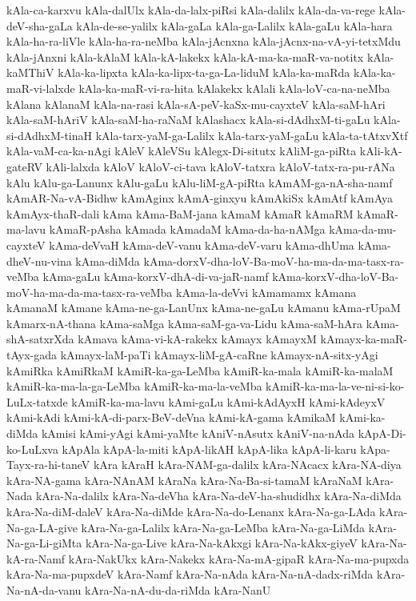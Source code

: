 {kAla-ca-karxvu
kAla-dalUlx
kAla-da-lalx-piRsi
kAla-dalilx
kAla-da-va-rege
kAla-deV-sha-gaLa
kAla-de-se-yalilx
kAla-gaLa
kAla-ga-Lalilx
kAla-gaLu
kAla-hara
kAla-ha-ra-liVle
kAla-ha-ra-neMba
kAla-jAcnxna
kAla-jAcnx-na-vA-yi-tetxMdu
kAla-jAnxni
kAla-kAlaM
kAla-kA-lakekx
kAla-kA-ma-ka-maR-va-notitx
kAla-kaMThiV
kAla-ka-lipxta
kAla-ka-lipx-ta-ga-La-liduM
kAla-ka-maRda
kAla-ka-maR-vi-lalxde
kAla-ka-maR-vi-ra-hita
kAlakekx
kAlali
kAla-loV-ca-na-neMba
kAlana
kAlanaM
kAla-na-rasi
kAla-sA-peV-kaSx-mu-cayxteV
kAla-saM-hAri
kAla-saM-hAriV
kAla-saM-ha-raNaM
kAlashacx
kAla-si-dAdhxM-ti-gaLu
kAla-si-dAdhxM-tinaH
kAla-tarx-yaM-ga-Lalilx
kAla-tarx-yaM-gaLu
kAla-ta-tAtxvXtf
kAla-vaM-ca-ka-nAgi
kAleV
kAleVSu
kAlegx-Di-situtx
kAliM-ga-piRta
kAli-kA-gateRV
kAli-lalxda
kAloV
kAloV-ci-tava
kAloV-tatxra
kAloV-tatx-ra-pu-rANa
kAlu
kAlu-ga-Lanunx
kAlu-gaLu
kAlu-liM-gA-piRta
kAmAM-ga-nA-sha-namf
kAmAR-Na-vA-Bidhw
kAmAginx
kAmA-ginxyu
kAmAkiSx
kAmAtf
kAmAya
kAmAyx-thaR-dali
kAma
kAma-BaM-jana
kAmaM
kAmaR
kAmaRM
kAmaR-ma-lavu
kAmaR-pAsha
kAmada
kAmadaM
kAma-da-ha-nAMga
kAma-da-mu-cayxteV
kAma-deVvaH
kAma-deV-vanu
kAma-deV-varu
kAma-dhUma
kAma-dheV-nu-vina
kAma-diMda
kAma-dorxV-dha-loV-Ba-moV-ha-ma-da-ma-tasx-ra-veMba
kAma-gaLu
kAma-korxV-dhA-di-va-jaR-namf
kAma-korxV-dha-loV-Ba-moV-ha-ma-da-ma-tasx-ra-veMba
kAma-la-deVvi
kAmamamx
kAmana
kAmanaM
kAmane
kAma-ne-ga-LanUnx
kAma-ne-gaLu
kAmanu
kAma-rUpaM
kAmarx-nA-thana
kAma-saMga
kAma-saM-ga-va-Lidu
kAma-saM-hAra
kAma-shA-satxrXda
kAmava
kAma-vi-kA-rakekx
kAmayx
kAmayxM
kAmayx-ka-maR-tAyx-gada
kAmayx-laM-paTi
kAmayx-liM-gA-caRne
kAmayx-nA-sitx-yAgi
kAmiRka
kAmiRkaM
kAmiR-ka-ga-LeMba
kAmiR-ka-mala
kAmiR-ka-malaM
kAmiR-ka-ma-la-ga-LeMba
kAmiR-ka-ma-la-veMba
kAmiR-ka-ma-la-ve-ni-si-ko-LuLx-tatxde
kAmiR-ka-ma-lavu
kAmi-gaLu
kAmi-kAdAyxH
kAmi-kAdeyxV
kAmi-kAdi
kAmi-kA-di-parx-BeV-deVna
kAmi-kA-gama
kAmikaM
kAmi-ka-diMda
kAmisi
kAmi-yAgi
kAmi-yaMte
kAniV-nAsutx
kAniV-na-nAda
kApA-Di-ko-LuLxva
kApAla
kApA-la-miti
kApA-likAH
kApA-lika
kApA-li-karu
kApa-Tayx-ra-hi-taneV
kAra
kAraH
kAra-NAM-ga-dalilx
kAra-NAcacx
kAra-NA-diya
kAra-NA-gama
kAra-NAnAM
kAraNa
kAra-Na-Ba-si-tamaM
kAraNaM
kAra-Nada
kAra-Na-dalilx
kAra-Na-deVha
kAra-Na-deV-ha-shudidhx
kAra-Na-diMda
kAra-Na-diM-daleV
kAra-Na-diMde
kAra-Na-do-Lenanx
kAra-Na-ga-LAda
kAra-Na-ga-LA-give
kAra-Na-ga-Lalilx
kAra-Na-ga-LeMba
kAra-Na-ga-LiMda
kAra-Na-ga-Li-giMta
kAra-Na-ga-Live
kAra-Na-kAkxgi
kAra-Na-kAkx-giyeV
kAra-Na-kA-ra-Namf
kAra-NakUkx
kAra-Nakekx
kAra-Na-mA-gipaR
kAra-Na-ma-pupxda
kAra-Na-ma-pupxdeV
kAra-Namf
kAra-Na-nAda
kAra-Na-nA-dadx-riMda
kAra-Na-nA-da-vanu
kAra-Na-nA-du-da-riMda
kAra-NanU
}
